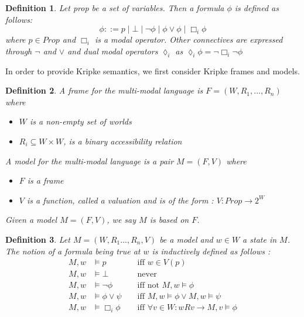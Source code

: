 \documentclass[12pt, a4paper]{scrartcl}
\newtheorem{definition}{Definition}[subsection]
\begin{document}
\begin{definition}
Let prop be a set of variables. Then a formula $\phi$ is defined as follows:
$$\phi ::= p \mid \bot \mid \neg \phi \mid \phi \lor \phi \mid \Box_i \phi$$
where $p \in Prop$ and $\Box_i$ is a modal operator. Other connectives are expressed through $\neg$ and $\lor$ and 
dual modal operators $\lozenge_i$ as $\lozenge_i \phi = \neg \Box_i \neg \phi$
\end{definition}

In order to provide Kripke semantics, we first consider Kripke frames and models.

\begin{definition}
    A frame for the multi-modal language is $F = (W,R_1,...,R_n)$ where 
    \begin{itemize}
        \item $W$ is a non-empty set of worlds
        \item $R_i \subseteq W \times W$, is a binary accessibility relation
    \end{itemize}

    A model for the multi-modal language is a pair $M = (F,V)$ where 
    \begin{itemize}
        \item $F$ is a frame
        \item $V$ is a function, called a valuation and is of the form :  $V : Prop \to 2^W$
    \end{itemize}
    Given a model $M = (F,V)$, we say $M$ is based on $F$.
\end{definition}

\begin{definition}
    Let $M = (W,R_1...,R_n,V)$ be a model and $w \in W$ a state in $M$. The notion of a formula being true at $w$ is inductively defined as follows :
    \begin{align*}
        M, w &\vDash p &&\text{ iff } w \in V(p) \\
        M, w &\vDash \bot  &&\text{ never } \\
        M, w &\vDash \neg \phi &&\text{ iff not } M, w \vDash \phi \\ 
        M, w &\vDash \phi \lor \psi &&\text{ iff } M,w \vDash \phi \lor M,w \vDash \psi \\
        M, w &\vDash \Box_i \phi &&\text{ iff } \forall v \in W : wRv \rightarrow M, v \vDash \phi
    \end{align*}

\end{definition}
\end{document}
